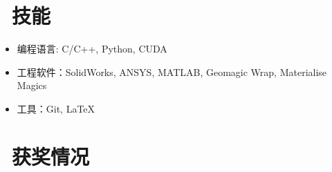\documentclass{resume}
\begin{document}

\section{\faCogs\ 技能}
\begin{itemize}[parsep=0.5ex]
  \item 编程语言: C/C++, Python, CUDA
  \item 工程软件：SolidWorks, ANSYS, MATLAB, Geomagic Wrap, Materialise Magics
  \item 工具：Git, \LaTeX
\end{itemize}

\section{\faHeartO\ 获奖情况}


%
%
\end{document}

